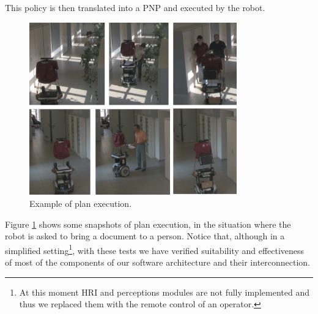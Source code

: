 This policy is then translated into a PNP and executed by the robot.

\begin{figure}
\centering
\includegraphics[width=0.8\textwidth]{fig/DIAGPrinter-demo}
\caption{Example of plan execution.}
\label{fig:DIAGtest}
\end{figure}


Figure \ref{fig:DIAGtest} shows some snapshots of plan execution, in the situation where the robot is asked to bring a document to a person. 
Notice that, although in a simplified setting\footnote{At this moment HRI and perceptions modules are not fully implemented and thus we replaced them with the remote control of an operator.}, with these tests we have verified suitability and effectiveness of most of the components of our software architecture and their interconnection.


